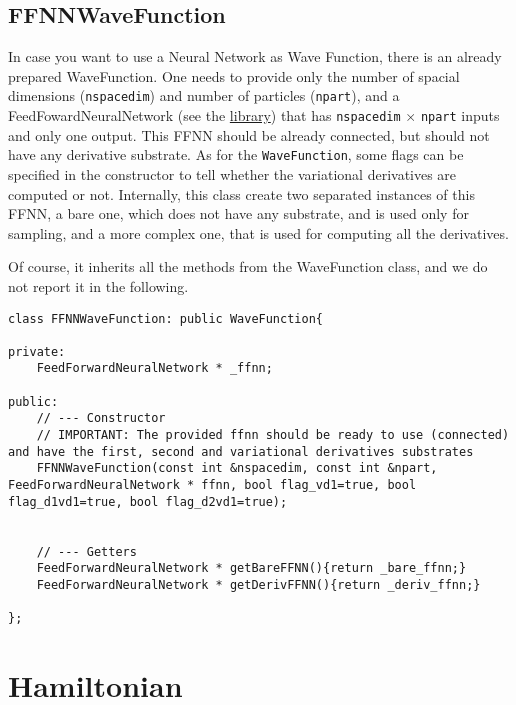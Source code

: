 \documentclass[11pt,a4paper,twoside]{article}
\begin{document}
\subsection{FFNNWaveFunction} %
\label{sub:ffnnwavefunction}

In case you want to use a Neural Network as Wave Function, there is an already prepared WaveFunction.
One needs to provide only the number of spacial dimensions (\verb+nspacedim+) and number of particles (\verb+npart+), and a FeedFowardNeuralNetwork (see the \href{https://github.com/francesco086/FeedForwardNeuralNetwork}{library}) that has \verb+nspacedim+ $\times$ \verb+npart+ inputs and only one output.
This FFNN should be already connected, but should not have any derivative substrate.
As for the \verb+WaveFunction+, some flags can be specified in the constructor to tell whether the variational derivatives are computed or not.
Internally, this class create two separated instances of this FFNN, a bare one, which does not have any substrate, and is used only for sampling, and a more complex one, that is used for computing all the derivatives.

Of course, it inherits all the methods from the WaveFunction class, and we do not report it in the following.

\begin{lstlisting}
class FFNNWaveFunction: public WaveFunction{

private:
    FeedForwardNeuralNetwork * _ffnn;

public:
    // --- Constructor
    // IMPORTANT: The provided ffnn should be ready to use (connected) and have the first, second and variational derivatives substrates
    FFNNWaveFunction(const int &nspacedim, const int &npart, FeedForwardNeuralNetwork * ffnn, bool flag_vd1=true, bool flag_d1vd1=true, bool flag_d2vd1=true);


    // --- Getters
    FeedForwardNeuralNetwork * getBareFFNN(){return _bare_ffnn;}
    FeedForwardNeuralNetwork * getDerivFFNN(){return _deriv_ffnn;}

};
\end{lstlisting}









\section{Hamiltonian} %
\label{sec:hamiltonian}
\end{document}

